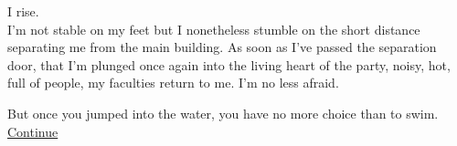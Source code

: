 \documentclass{report}
\newcommand{\glink}[2]{
	\hyperref[#1]{#2}
}
\begin{document}
I rise.\\

I'm not stable on my feet but I nonetheless stumble on the short distance separating me from the main building. As soon as I've passed the separation door, that I'm plunged once again into the living heart of the party, noisy, hot, full of people, my faculties return to me. I'm no less afraid.

But once you jumped into the water, you have no more choice than to swim.\\

\glink{Searching for her}{Continue}\\

\begin{comment}
Most must be already quite drunk, especially the athletes who already enjoyed a \emph{generous} meal after their morning achievements.\\
 
I feel fire rising to my cheeks.

As per tradition, the morning was filled with numerous sportive events. Nothing as glorious as the Olympic games, but still a good deal of different competitions: jumping, wrestling, javelin throws, horse races... But I have little memories of all of them, completely eclipsed by the one which dried out my throat. The foot race.\\

More exactly, it's not the competition itself which left me unable to speak. I cannot even remember the name of the one who won it. But I do remember that she took part in it.

It's not that unusual for a woman to participate in such an event. Actually, there is often a token Spartan female athlete alongside the males, and they generally do quite well.

But that was not any woman. That was her.\\

These events are before everything else a present to the gods, and the competitors must be as resplendent as they are skilled, the sight of their nude bodies as much an offering as their actual performances.\\

And resplendent she was.\\

I helped her oiled herself before dawn, but there is a total difference between watching a greasy skin from close under the weak light of a candle and contemplating it shining under the bright sun.


\end{comment}
\end{document}
